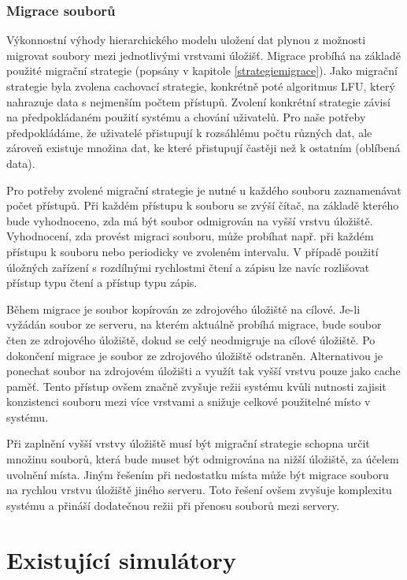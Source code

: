 \documentclass[czech,DP]{thesiskiv}
\begin{document}
\subsection{Migrace souborů}
Výkonnostní výhody hierarchického modelu uložení dat plynou z možnosti migrovat soubory mezi jednotlivými vrstvami úložišť. Migrace probíhá na základě použité migrační strategie (popsány v kapitole \ref{strategiemigrace}). Jako migrační strategie byla zvolena cachovací strategie, konkrétně poté algoritmus LFU, který nahrazuje data s nejmenším počtem přístupů. Zvolení konkrétní strategie závisí na předpokládaném použití systému a chování uživatelů. Pro naše potřeby předpokládáme, že uživatelé přistupují k rozsáhlému počtu různých dat, ale zároveň existuje množina dat, ke které přistupují častěji než k ostatním (oblíbená data).

Pro potřeby zvolené migrační strategie je nutné u každého souboru zaznamenávat počet přístupů. Při každém přístupu k souboru se zvýší čítač, na základě kterého bude vyhodnoceno, zda má být soubor odmigrován na vyšší vrstvu úložiště. Vyhodnocení, zda provést migraci souboru, může probíhat např. při každém přístupu k souboru nebo periodicky ve zvoleném intervalu. V případě použití úložných zařízení s rozdílnými rychlostmi čtení a zápisu lze navíc rozlišovat přístup typu čtení a přístup typu zápis.

Během migrace je soubor kopírován ze zdrojového úložiště na cílové. Je-li vyžádán soubor ze serveru, na kterém aktuálně probíhá migrace, bude soubor čten ze zdrojového úložiště, dokud se celý neodmigruje na cílové úložiště. Po dokončení migrace je soubor ze zdrojového úložiště odstraněn. Alternativou je ponechat soubor na zdrojovém úložišti a využít tak vyšší vrstvu pouze jako cache paměť. Tento přístup ovšem značně zvyšuje režii systému kvůli nutnosti zajisit konzistenci souboru mezi více vrstvami a snižuje celkové použitelné místo v systému.

Při zaplnění vyšší vrstvy úložiště musí být migrační strategie schopna určit množinu souborů, která bude muset být odmigrována na nižší úložiště, za účelem uvolnění místa. Jiným řešením při nedostatku místa může být migrace souboru na rychlou vrstvu úložiště jiného serveru. Toto řešení ovšem zvyšuje komplexitu systému a přináší dodatečnou režii při přenosu souborů mezi servery.


\chapter{Existující simulátory} \label{existujicisimulatory}
\end{document}
